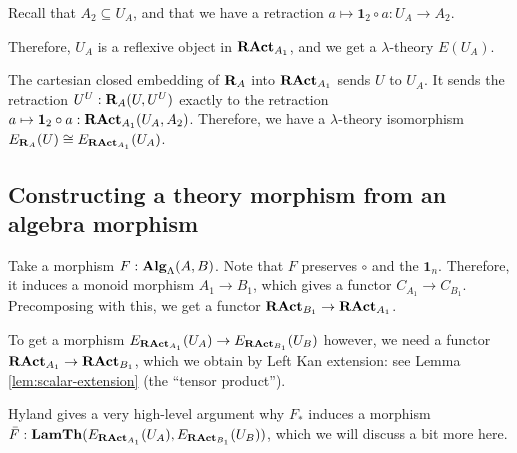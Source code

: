\begin{definition}\label{def:lambda-algebra-to-lambda-theory}
  Recall that $ A_2 \subseteq U_A $, and that we have a retraction $ a \mapsto \mathbf 1_2 \circ a : U_A \to A_2 $.

  Therefore, $ U_A $ is a reflexive object in $ \mathbf{RAct}_{A_1} $, and we get a $ \lambda $-theory $ E(U_A) $.
\end{definition}

\begin{remark}
  The cartesian closed embedding of $ \mathbf{R}_A $ into $ \mathbf{RAct}_{A_1} $ sends $ U $ to $ U_A $. It sends the retraction $ U^U: \mathbf{R}_A(U, U^U) $ exactly to the retraction $ a \mapsto \mathbf 1_2 \circ a: \mathbf{RAct}_{A_1}(U_A, A_2) $. Therefore, we have a $ \lambda $-theory isomorphism $ E_{\mathbf{R}_A}(U) \cong E_{\mathbf{RAct}_{A_1}}(U_A) $.
\end{remark}

\subsection{Constructing a theory morphism from an algebra morphism}

Take a morphism $ F: \mathbf{Alg}_{\Lambda}(A, B) $. Note that $ F $ preserves $ \circ $ and the $ \mathbf 1_n $. Therefore, it induces a monoid morphism $ A_1 \to B_1 $, which gives a functor $ C_{A_1} \to C_{B_1} $. Precomposing with this, we get a functor $ \mathbf{RAct}_{B_1} \to \mathbf{RAct}_{A_1} $.

To get a morphism $ E_{\mathbf{RAct}_{A_1}}(U_A) \to E_{\mathbf{RAct}_{B_1}}(U_B) $ however, we need a functor $ \mathbf{RAct}_{A_1} \to \mathbf{RAct}_{B_1} $, which we obtain by Left Kan extension: see Lemma \ref{lem:scalar-extension} (the ``tensor product'').

Hyland gives a very high-level argument why $ F_* $ induces a morphism $ \bar F : \mathbf{LamTh}(E_{\mathbf{RAct}_{A_1}}(U_A), E_{\mathbf{RAct}_{B_1}}(U_B)) $, which we will discuss a bit more here.

